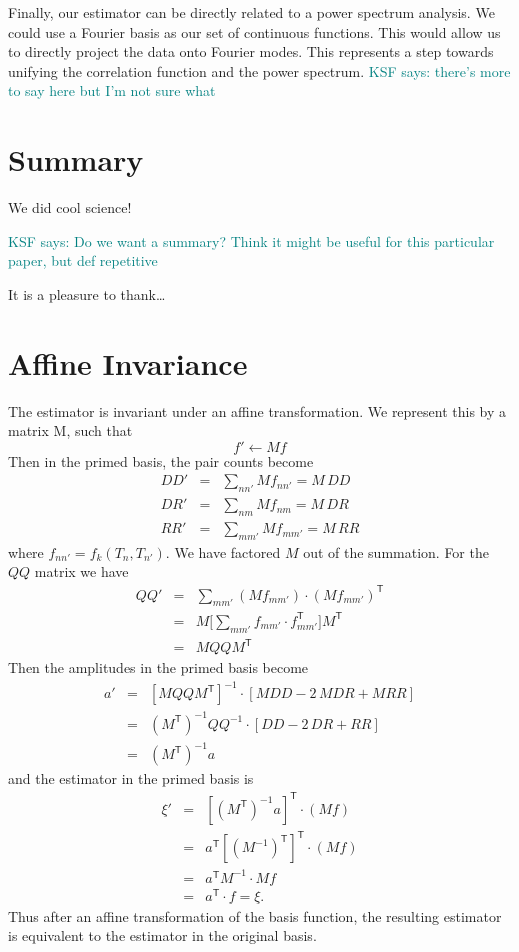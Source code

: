 \documentclass[modern]{aastex62}
\newcommand{\inv}{^{-1}}
\newcommand{\T}{^{\mathsf{T}}}
\newcommand{\KSF}[1]{\textcolor{teal}{KSF says: #1}}
\begin{document}
Finally, our estimator can be directly related to a power spectrum analysis.
We could use a Fourier basis as our set of continuous functions.
This would allow us to directly project the data onto Fourier modes.
This represents a step towards unifying the correlation function and the power spectrum. \KSF{there's more to say here but I'm not sure what}


\section{Summary}

We did cool science!

\KSF{Do we want a summary? Think it might be useful for this particular paper, but def repetitive}

\acknowledgements
It is a pleasure to thank\ldots

\appendix
\section{Affine Invariance}\label{sec:affine}

The estimator is invariant under an affine transformation. We represent this by a matrix M, such that 
\begin{equation}
f' \leftarrow Mf
\end{equation}
Then in the primed basis, the pair counts become
\begin{eqnarray}\displaystyle
DD' &=& \sum_{n n'} M f_{n n'} = M\,DD
\\
DR' &=& \sum_{n m} M f_{n m} = M\,DR
\\
RR' &=& \sum_{m m'} M f_{m m'} = M\,RR
\end{eqnarray}
where $f_{n n'} = f_k(T_n, T_{n'})$.
We have factored $M$ out of the summation. For the $QQ$ matrix we have
\begin{eqnarray}\displaystyle
QQ' &=& \sum_{m m'} (Mf_{m m'}) \cdot (Mf_{m m'})\T \\
&=& M\Bigg[ \sum_{m m'} f_{m m'} \cdot f_{m m'}\T \Bigg]M\T \\
&=& M QQ M\T
\end{eqnarray}
Then the amplitudes in the primed basis become
\begin{eqnarray}\displaystyle
a' &=& [M QQ M\T]\inv \cdot [MDD - 2\,MDR + MRR] \\
&=& (M\T)\inv QQ\inv \cdot [DD - 2\,DR + RR] \\
&=& (M\T)\inv a
\end{eqnarray}
and the estimator in the primed basis is 
\begin{eqnarray}\displaystyle
\xi' &=& [(M\T)\inv a]\T \cdot (Mf) \\
&=& a\T[(M\inv)\T]\T \cdot (Mf) \\
&=& a\T M\inv \cdot Mf \\
&=& a\T \cdot f = \xi.
\end{eqnarray}
Thus after an affine transformation of the basis function, the resulting estimator is equivalent to the estimator in the original basis.
\end{document}
